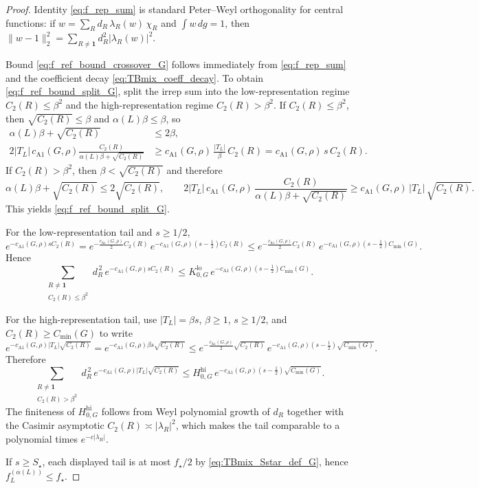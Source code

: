 \begin{proof}
Identity \eqref{eq:f_rep_sum} is standard Peter--Weyl orthogonality for central functions:
if $w=\sum_R d_R\,\lambda_R(w)\,\chi_R$ and $\int w\,dg=1$, then
$\|w-1\|_2^2=\sum_{R\neq\mathbf 1} d_R^2|\lambda_R(w)|^2$.

Bound \eqref{eq:f_ref_bound_crossover_G} follows immediately from \eqref{eq:f_rep_sum} and the coefficient decay
\eqref{eq:TBmix_coeff_decay}.
To obtain \eqref{eq:f_ref_bound_split_G}, split the irrep sum into the low-representation regime $C_2(R)\le\beta^2$ and the high-representation regime $C_2(R)>\beta^2$.
If $C_2(R)\le\beta^2$, then $\sqrt{C_2(R)}\le\beta$ and $\alpha(L)\beta\le\beta$, so
\[
\begin{aligned}
\alpha(L)\beta+\sqrt{C_2(R)}&\le 2\beta,\\
2|T_L|\,c_{\mathrm{A1}}(G,\rho)
\frac{C_2(R)}{\alpha(L)\beta+\sqrt{C_2(R)}}
&\ge c_{\mathrm{A1}}(G,\rho)\,\frac{|T_L|}{\beta}\,C_2(R)
=c_{\mathrm{A1}}(G,\rho)\,s\,C_2(R).
\end{aligned}
\]
If $C_2(R)>\beta^2$, then $\beta<\sqrt{C_2(R)}$ and therefore
\[
\alpha(L)\beta+\sqrt{C_2(R)}\le 2\sqrt{C_2(R)},
\qquad
2|T_L|\,c_{\mathrm{A1}}(G,\rho)\,\frac{C_2(R)}{\alpha(L)\beta+\sqrt{C_2(R)}}\ge c_{\mathrm{A1}}(G,\rho)\,|T_L|\,\sqrt{C_2(R)}.
\]
This yields \eqref{eq:f_ref_bound_split_G}.

For the low-representation tail and $s\ge 1/2$,
\[
 e^{-c_{\mathrm{A1}}(G,\rho)sC_2(R)}
 = e^{-\frac{c_{\mathrm{A1}}(G,\rho)}{2}C_2(R)}\,e^{-c_{\mathrm{A1}}(G,\rho)(s-\frac12)C_2(R)}
 \le e^{-\frac{c_{\mathrm{A1}}(G,\rho)}{2}C_2(R)}\,e^{-c_{\mathrm{A1}}(G,\rho)(s-\frac12)C_{\min}(G)}.
\]
Hence
\[
\sum_{\substack{R\neq\mathbf 1\\ C_2(R)\le\beta^2}} d_R^{\,2}\,e^{-c_{\mathrm{A1}}(G,\rho)sC_2(R)}
\le
K^{\mathrm{lo}}_{0,G}\,e^{-c_{\mathrm{A1}}(G,\rho)(s-\frac12)C_{\min}(G)}.
\]

For the high-representation tail, use $|T_L|=\beta s$, $\beta\ge1$, $s\ge1/2$, and $C_2(R)\ge C_{\min}(G)$ to write
\[
 e^{-c_{\mathrm{A1}}(G,\rho)|T_L|\sqrt{C_2(R)}}
 =
 e^{-c_{\mathrm{A1}}(G,\rho)\beta s\sqrt{C_2(R)}}
 \le
 e^{-\frac{c_{\mathrm{A1}}(G,\rho)}{2}\sqrt{C_2(R)}}\,
 e^{-c_{\mathrm{A1}}(G,\rho)(s-\frac12)\sqrt{C_{\min}(G)}}.
\]
Therefore
\[
\sum_{\substack{R\neq\mathbf 1\\ C_2(R)>\beta^2}} d_R^{\,2}\,e^{-c_{\mathrm{A1}}(G,\rho)|T_L|\sqrt{C_2(R)}}
\le
H^{\mathrm{hi}}_{0,G}\,e^{-c_{\mathrm{A1}}(G,\rho)(s-\frac12)\sqrt{C_{\min}(G)}}.
\]
The finiteness of $H^{\mathrm{hi}}_{0,G}$ follows from Weyl polynomial growth of $d_R$ together with the Casimir asymptotic $C_2(R)\asymp |\lambda_R|^2$, which makes the tail comparable to a polynomial times $e^{-c|\lambda_R|}$.

If $s\ge S_\star$, each displayed tail is at most $f_\star/2$ by \eqref{eq:TBmix_Sstar_def_G}, hence $f_L^{(\alpha(L))}\le f_\star$.
\end{proof}

